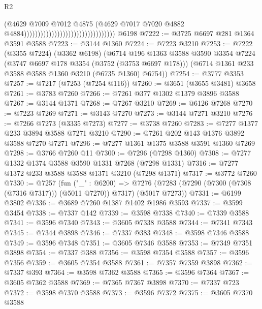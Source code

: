 \begin{lexlean}{R2}
\begin{coremodule}
                                                                  (@4629
                                                                    @7009
                                                                    @7012
                                                                    @4875
                                                                    (@4629
                                                                      @7017
                                                                      @7020
                                                                      @4882
                                                                      @4884)))))))))))))))))))))))))))))))))
    @6198
@7222 := @3725 @6697 @281 @1364 @3591 @3588
@7223 := @3144 @1360
@7224 := @7223 @3210
@7253 := @7222
    (@3355 @7224)
    (@3362 @6198)
    (@6714
      @196
      @1363
      @3588
      @3590
      @3354
      @7224
      (@3747 @6697 @178 @3354 (@3752 (@3753 @6697 @178)))
      (@6714 @1361 @233 @3588 @3588 @1360 @3210 (@6735 @1360) @6754))
@7254 := @3777 @3353
@7257 := @7217 (@7253 (@7254 @116))
@7260 := @3651 (@3655 @3481) @3658
@7261 := @3783 @7260
@7266 := @7261 @377 @1302 @1379 @3896 @3588
@7267 := @3144 @1371
@7268 := @7267 @3210
@7269 := @6126 @7268
@7270 := @7223 @7269
@7271 := @3143 @7270
@7273 := @3144 @7271 @3210
@7276 := @7266 @7273 (@3335 @7273)
@7277 := @3738 @7260
@7283 := @7277 @1377 @233 @3894 @3588 @7271 @3210
@7290 := @7261 @202 @143 @1376 @3892 @3588 @7270 @7271
@7296 := @7277 @1361 @1375 @3588 @3591 @1360 @7269
@7298 := @3766 @7260 @11
@7300 := @7296 (@7298 @1360)
@7308 := @7277 @1332 @1374 @3588 @3590 @1331 @7268 (@7298 @1331)
@7316 := @7277 @1372 @233 @3588 @3588 @1371 @3210 (@7298 @1371)
@7317 := @3772 @7260
@7330 := @7257
    (fun ("_" : @6200) =>
    @7276 (@7283 (@7290 (@7300 (@7308 (@7316 @7317))) (@5011 @7270)) @7317) (@5017 @7273))
@7331 := @6199 @3802
@7336 := @3689 @7260 @1387 @1402 @1986 @3593
@7337 := @3599 @3454
@7338 := @7337 @142
@7339 := @3598 @7338
@7340 := @7339 @3588
@7341 := @3596 @7340
@7343 := @3605 @7338 @3588
@7344 := @7341 @7343
@7345 := @7344 @3898
@7346 := @7337 @383
@7348 := @3598 @7346 @3588
@7349 := @3596 @7348
@7351 := @3605 @7346 @3588
@7353 := @7349 @7351 @3898
@7354 := @7337 @388
@7356 := @3598 @7354 @3588
@7357 := @3596 @7356
@7359 := @3605 @7354 @3588
@7361 := @7357 @7359 @3898
@7362 := @7337 @393
@7364 := @3598 @7362 @3588
@7365 := @3596 @7364
@7367 := @3605 @7362 @3588
@7369 := @7365 @7367 @3898
@7370 := @7337 @723
@7372 := @3598 @7370 @3588
@7373 := @3596 @7372
@7375 := @3605 @7370 @3588

\end{coremodule}
\end{lexlean}
